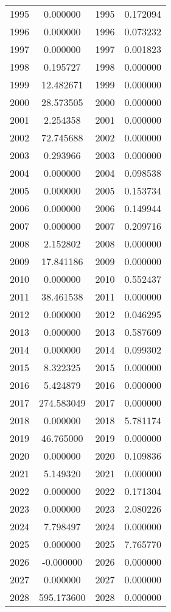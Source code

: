 \documentclass[12pt]{article}
\begin{document}
\begin{longtable}{@{}cccc@{}}
1995 & 0.000000 & 1995 & 0.172094 \\
1996 & 0.000000 & 1996 & 0.073232 \\
1997 & 0.000000 & 1997 & 0.001823 \\
1998 & 0.195727 & 1998 & 0.000000 \\
1999 & 12.482671 & 1999 & 0.000000 \\
2000 & 28.573505 & 2000 & 0.000000 \\
2001 & 2.254358 & 2001 & 0.000000 \\
2002 & 72.745688 & 2002 & 0.000000 \\
2003 & 0.293966 & 2003 & 0.000000 \\
2004 & 0.000000 & 2004 & 0.098538 \\
2005 & 0.000000 & 2005 & 0.153734 \\
2006 & 0.000000 & 2006 & 0.149944 \\
2007 & 0.000000 & 2007 & 0.209716 \\
2008 & 2.152802 & 2008 & 0.000000 \\
2009 & 17.841186 & 2009 & 0.000000 \\
2010 & 0.000000 & 2010 & 0.552437 \\
2011 & 38.461538 & 2011 & 0.000000 \\
2012 & 0.000000 & 2012 & 0.046295 \\
2013 & 0.000000 & 2013 & 0.587609 \\
2014 & 0.000000 & 2014 & 0.099302 \\
2015 & 8.322325 & 2015 & 0.000000 \\
2016 & 5.424879 & 2016 & 0.000000 \\
2017 & 274.583049 & 2017 & 0.000000 \\
2018 & 0.000000 & 2018 & 5.781174 \\
2019 & 46.765000 & 2019 & 0.000000 \\
2020 & 0.000000 & 2020 & 0.109836 \\
2021 & 5.149320 & 2021 & 0.000000 \\
2022 & 0.000000 & 2022 & 0.171304 \\
2023 & 0.000000 & 2023 & 2.080226 \\
2024 & 7.798497 & 2024 & 0.000000 \\
2025 & 0.000000 & 2025 & 7.765770 \\
2026 & -0.000000 & 2026 & 0.000000 \\
2027 & 0.000000 & 2027 & 0.000000 \\
2028 & 595.173600 & 2028 & 0.000000 \\

\end{longtable}
\end{document}
